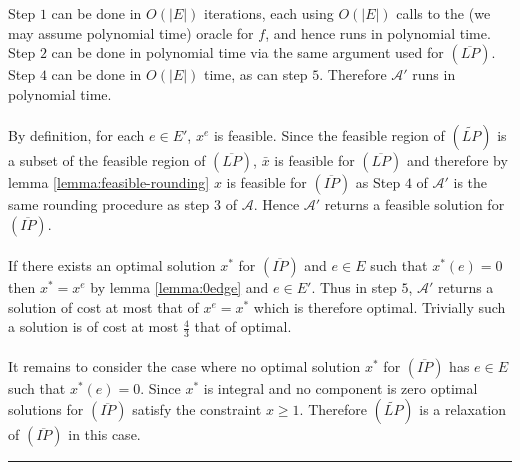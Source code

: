\documentclass[letterpaper,12pt,oneside,onecolumn]{article}
\newcommand{\cA}{\mathcal{A}} \newcommand{\cB}{\mathcal{B}}
\newenvironment{proof}{{\bf Proof:  }}{\hfill\rule{2mm}{2mm}}
\begin{document}
\begin{proof}
Step $1$ can be done in $O(|E|)$ iterations, each using $O(|E|)$ calls to the (we may assume polynomial time) oracle for $f$, and hence runs in polynomial time. Step $2$ can be done in polynomial time via the same argument used for $(\overline{LP})$. Step $4$ can be done in $O(|E|)$ time, as can step $5$. Therefore $\cA'$ runs in polynomial time. 
\paragraph{}
By definition, for each $e \in E'$, $x^{e}$ is feasible. Since the feasible region of $(\tilde{LP})$ is a subset of the feasible region of $(\overline{LP})$, $\bar{x}$ is feasible for $(\overline{LP})$ and therefore by lemma \ref{lemma:feasible-rounding} $x$ is feasible for $(\overline{IP})$ as Step $4$ of $\cA'$ is the same rounding procedure as step $3$ of $\cA$. Hence $\cA'$ returns a feasible solution for $(\overline{IP})$.
\paragraph{}
If there exists an optimal solution $x^*$ for $(\overline{IP})$ and $e \in E$ such that $x^*(e) = 0$ then $x^* = x^{e}$ by lemma \ref{lemma:0edge} and $e \in E'$. Thus in step $5$, $\cA'$ returns a solution of cost at most that of $x^{e} = x^*$ which is therefore optimal. Trivially such a solution is of cost at most $\frac{4}{3}$ that of optimal.
\paragraph{}
It remains to consider the case where no optimal solution $x^*$ for $(\overline{IP})$ has $e\in E$ such that $x^*(e) = 0$. Since $x^*$ is integral and no component is zero optimal solutions for $(\overline{IP})$ satisfy the constraint $x\geq 1$. Therefore $(\tilde{LP})$ is a relaxation of $(\overline{IP})$ in this case.

\end{proof}
\end{document}
